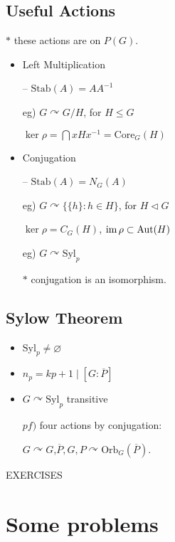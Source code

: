 \documentclass[11pt]{article}
\let\realsection\section
\renewcommand\section{\newpage\realsection}
\begin{document}
\subsection*{Useful Actions}
$*$ these actions are on $P(G)$.
\begin{itemize}
\item Left Multiplication
	\par-- $\text{Stab}(A)=AA^{-1}$
	\par eg) $G\curvearrowright G/H$, for $H\le G$
		\par\qquad $\ker\rho=\bigcap xHx^{-1}=\text{Core}_G(H)$
\item Conjugation
	\par-- $\text{Stab}(A)=N_G(A)$
	\par eg) $G\curvearrowright\{\{h\}:h\in H\}$, for $H\lhd G$
		\par\qquad $\ker\rho=C_G(H)$, $\operatorname{im}\rho\subset\text{Aut}(H)$
	\par eg) $G\curvearrowright\text{Syl}_p$
	\par$*$ conjugation is an isomorphism.
\end{itemize}


\subsection*{Sylow Theorem}

\begin{itemize}
\item $\text{Syl}_p\ne\varnothing$
\item $n_p=kp+1\mid\left[G:\overline P\right]$
\item $G\curvearrowright\text{Syl}_p$ transitive
	\par $pf)$ four actions by conjugation:
	\par\quad $G\curvearrowright G$,\quad $\overline P,G,P\curvearrowright\text{Orb}_G(\overline P)$.
\end{itemize}

\bigskip
EXERCISES

\section{Some problems}
\end{document}

